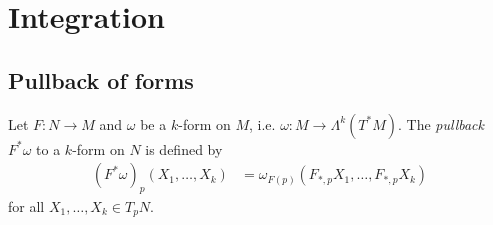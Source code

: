 \section{Integration}

\subsection{Pullback of forms}
Let $F : N \to M$ and $\omega$ be a $k$-form on $M$,
i.e. $\omega: M \to \Lambda^k(T^\ast M)$.
The \emph{pullback} $F^\ast \omega$ to a $k$-form on
$N$ is defined by
\begin{align*}
   (F^\ast\omega)_p
     (X_1, \dots, X_k)
&= \omega_{F(p)}
     (F_{\ast, p} X_1, \dots, F_{\ast, p} X_k)
\end{align*}
for all $X_1, \dots, X_k \in T_p N$.

